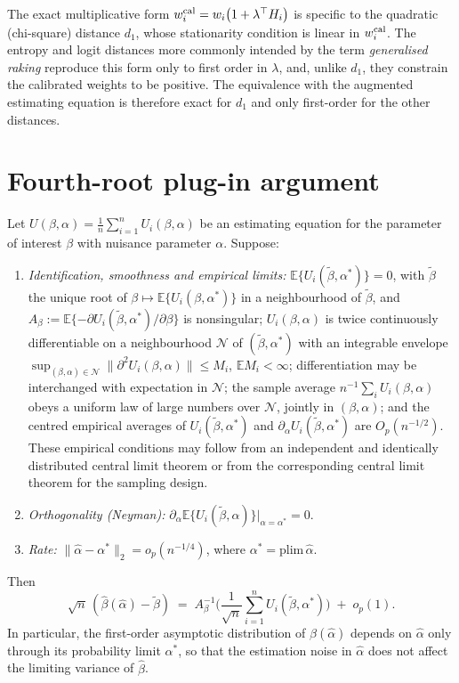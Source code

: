 \begin{remark}\label{rem:raking-distance}
The exact multiplicative form $w_i^{\rm cal}=w_i\bigl(1+\lambda^\top H_i\bigr)$ is specific to the quadratic (chi-square) distance $d_1$, whose stationarity condition is linear in $w_i^{\rm cal}$. The entropy and logit distances more commonly intended by the term \emph{generalised raking} reproduce this form only to first order in $\lambda$, and, unlike $d_1$, they constrain the calibrated weights to be positive. The equivalence with the augmented estimating equation is therefore exact for $d_1$ and only first-order for the other distances.
\end{remark}

\section{Fourth-root plug-in argument}\label{app:fourth-root}

\begin{proposition}\label{prop:fourth-root}
Let $U(\beta,\alpha)=\frac{1}{n}\sum_{i=1}^n U_i(\beta,\alpha)$ be an estimating equation for the parameter of interest $\beta$ with nuisance parameter $\alpha$. Suppose:
\begin{enumerate}\setlength\itemsep{2pt}
\item[(A1)] \emph{Identification, smoothness and empirical limits:} $\mathbb{E}\{U_i(\tilde\beta,\alpha^*)\}=0$, with $\tilde\beta$ the unique root of $\beta\mapsto\mathbb{E}\{U_i(\beta,\alpha^*)\}$ in a neighbourhood of $\tilde\beta$, and $A_\beta:=\mathbb{E}\{-\partial U_i(\tilde\beta,\alpha^*)/\partial\beta\}$ is nonsingular; $U_i(\beta,\alpha)$ is twice continuously differentiable on a neighbourhood $\mathcal{N}$ of $(\tilde\beta,\alpha^*)$ with an integrable envelope $\sup_{(\beta,\alpha)\in\mathcal{N}}\lVert\partial^2 U_i(\beta,\alpha)\rVert\le M_i$, $\mathbb{E}M_i<\infty$; differentiation may be interchanged with expectation in $\mathcal{N}$; the sample average $n^{-1}\sum_i U_i(\beta,\alpha)$ obeys a uniform law of large numbers over $\mathcal{N}$, jointly in $(\beta,\alpha)$; and the centred empirical averages of $U_i(\tilde\beta,\alpha^*)$ and $\partial_\alpha U_i(\tilde\beta,\alpha^*)$ are $O_p(n^{-1/2})$. These empirical conditions may follow from an independent and identically distributed central limit theorem or from the corresponding central limit theorem for the sampling design.
\item[(A2)] \emph{Orthogonality (Neyman):} $\partial_\alpha \mathbb{E}\{U_i(\tilde\beta,\alpha)\}\big|_{\alpha=\alpha^*}=0$.
\item[(A3)] \emph{Rate:} $\|\hat\alpha - \alpha^*\|_2 = o_p(n^{-1/4})$, where $\alpha^* = \mathrm{plim}\,\hat\alpha$.
\end{enumerate}
Then
\[
\sqrt{n}\,(\hat\beta(\hat\alpha) - \tilde\beta) \;=\; A_\beta^{-1}\Big(\frac{1}{\sqrt{n}}\sum_{i=1}^n U_i(\tilde\beta, \alpha^*)\Big) \;+\; o_p(1).
\]
In particular, the first-order asymptotic distribution of $\hat\beta(\hat\alpha)$ depends on $\hat\alpha$ only through its probability limit $\alpha^*$, so that the estimation noise in $\hat\alpha$ does not affect the limiting variance of $\hat\beta$.
\end{proposition}

